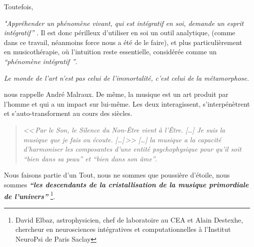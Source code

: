 Toutefois,

\textit{"Appréhender un phénomène vivant, qui est intégratif en soi, demande un esprit
  intégratif''} \autocite[201]{van_eersel_cerveau}.
Il est donc périlleux d'utiliser en soi un outil analytique, (comme dans ce travail, néanmoins force nous a été de le faire), et
plus
particulièrement en musicothérapie, où l'intuition reste essentielle,
considérée comme un \textit{``phénomène intégratif ''}.

\emph{Le monde de
	l'art n'est pas celui de l'immortalité, c'est celui de la
        métamorphose.}

      nous rappelle André Malraux.
      De même, la musique est un art produit par l'homme et qui a un impact
sur lui-même. Les deux interagissent, s'interpénètrent et s'auto-transforment
au cours des siècles.
\begin{quotation}
\emph{<<\,\emph{Par le Son, le Silence du Non-Être vient à l'Être}. [\dots]
\textsl{Je suis}
	\emph{la musique que je fais ou écoute}. [\dots]\,>>
[\ldots] \emph{la musique a la capacité d'harmoniser
les composantes d'une entité psychophysique pour qu'il soit ``bien
dans sa peau'' et ``bien dans son âme}''}.\, \autocite[ch. 1, p.8]{viret:b}
\end{quotation}

Nous faisons partie d'un Tout, nous ne sommes que poussière d'étoile,
nous sommes
\textit{\textbf{``les descendants de la  cristallisation de la musique primordiale de
l'univers''}} \autocite{delbaz_recherche_2016} \footnote{David Elbaz, astrophysicien, chef de laboratoire au CEA et Alain
Destexhe, chercheur en neurosciences intégratives et computationnelles
à l'Institut  NeuroPsi de Paris Saclay}.




